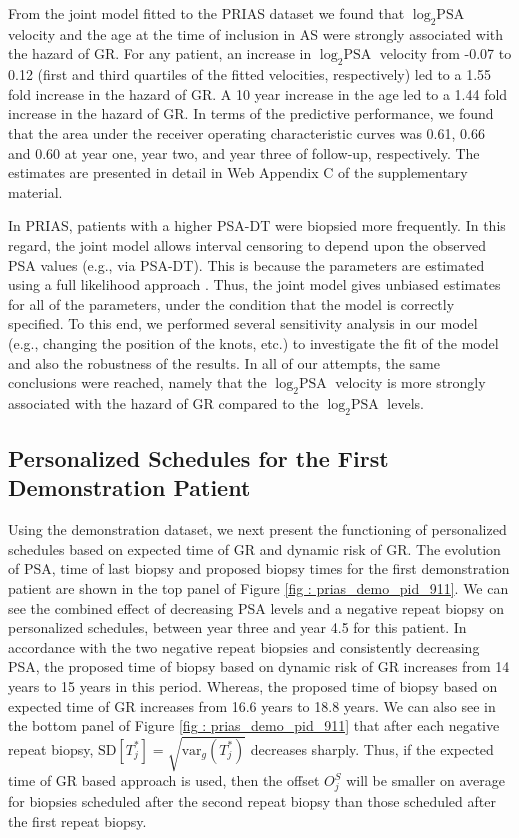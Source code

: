 From the joint model fitted to the PRIAS dataset we found that $\log_2 \mbox{PSA}$ velocity and the age at the time of inclusion in AS were strongly associated with the hazard of GR. For any patient, an increase in $\log_2 \mbox{PSA}$ velocity from -0.07 to 0.12 (first and third quartiles of the fitted velocities, respectively) led to a 1.55 fold increase in the hazard of GR. A 10 year increase in the age led to a 1.44 fold increase in the hazard of GR. In terms of the predictive performance, we found that the area under the receiver operating characteristic curves \citep{landmarking2017} was 0.61, 0.66 and 0.60 at year one, year two, and year three of follow-up, respectively. The estimates are presented in detail in Web Appendix C of the supplementary material.

In PRIAS, patients with a higher PSA-DT were biopsied more frequently. In this regard, the joint model allows interval censoring to depend upon the observed PSA values (e.g., via PSA-DT). This is because the parameters are estimated using a full likelihood approach \citep{tsiatis2004joint}. Thus, the joint model gives unbiased estimates for all of the parameters, under the condition that the model is correctly specified. To this end, we performed several sensitivity analysis in our model (e.g., changing the position of the knots, etc.) to investigate the fit of the model and also the robustness of the results. In all of our attempts, the same conclusions were reached, namely that the $\log_2 \mbox{PSA}$ velocity is more strongly associated with the hazard of GR compared to the $\log_2 \mbox{PSA}$ levels.

\subsection{Personalized Schedules for the First Demonstration Patient}
\label{subsec : demo_prias_pers_schedule}
Using the demonstration dataset, we next present the functioning of personalized schedules based on expected time of GR and dynamic risk of GR. The evolution of PSA, time of last biopsy and proposed biopsy times for the first demonstration patient are shown in the top panel of Figure \ref{fig : prias_demo_pid_911}. We can see the combined effect of decreasing PSA levels and a negative repeat biopsy on personalized schedules, between year three and year 4.5 for this patient. In accordance with the two negative repeat biopsies and consistently decreasing PSA, the proposed time of biopsy based on dynamic risk of GR increases from 14 years to 15 years in this period. Whereas, the proposed time of biopsy based on expected time of GR increases from 16.6 years to 18.8 years. We can also see in the bottom panel of Figure \ref{fig : prias_demo_pid_911} that after each negative repeat biopsy, $\mbox{SD}[T^*_j] = \sqrt{\mbox{var}_g(T^*_j)}$ decreases sharply. Thus, if the expected time of GR based approach is used, then the offset $O^S_j$ will be smaller on average for biopsies scheduled after the second repeat biopsy than those scheduled after the first repeat biopsy.

